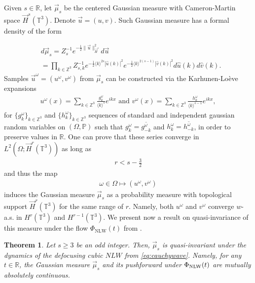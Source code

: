 \documentclass[a4paper, reqno, 11pt]{amsart}
\newtheorem{theorem}{Theorem}[section]
\theoremstyle{definition}
\begin{document}
Given $s \in \mathbb{R}$, let $\vec{\mu}_s$ be the centered Gaussian measure with Cameron-Martin space $\vec{H}^s(\mathbb{T}^3)$. Denote $\vec{u} = (u,v)$. Such Gaussian measure has a formal density of the form

\begin{align*}
&d \vec{\mu}_s = Z_s^{-1} e^{-\frac{1}{2} \| \vec{u} \|^2_{\vec{H}^s}} d\vec{u} \nonumber \\
&= \prod_{k \in \mathbb{Z}^3} Z_{s,k}^{-1} e^{-\frac{1}{2} \langle k \rangle^{2s} |\widehat{u}(k)|^2} e^{-\frac{1}{2} \langle k \rangle^{2(s-1)} |\widehat{v}(k)|^2} d \widehat{u}(k) d\widehat{v}(k).
\end{align*}
Samples $\vec{u}^{\omega} = (u^{\omega},v^{\omega})$ from $\vec{\mu}_s$ can be constructed via the Karhunen-Loève expansions
\begin{align}\label{eq:randomid}
u^{\omega}(x) = \sum_{k \in \mathbb{Z}^3} \frac{g_k^{\omega}}{\langle k \rangle^s} e^{ikx} \text{ and }  v^{\omega}(x) = \sum_{k \in \mathbb{Z}^3} \frac{h_k^{\omega}}{\langle k \rangle^{s-1}} e^{ikx},
\end{align}
for $\{g_k^{\omega}\}_{k \in \mathbb{Z}^3}$ and $\{h_k^{\omega}\}_{k \in \mathbb{Z}^3}$ sequences of standard and independent gaussian random variables on $(\Omega,\mathbb{P})$ such that $g_k^{\omega} = \overline{g_{-k}^{\omega}}$ and $h_k^{\omega} = \overline{h_{-k}^{\omega}}$, in order to preserve values in $\mathbb{R}$. One can prove that these series converge in $L^2(\Omega;\vec{H}^r(\mathbb{T}^3))$ as long as
\begin{align*}
r < s - \frac{3}{2}
\end{align*}
and thus the map
\begin{align*}
\omega \in \Omega \mapsto (u^{\omega},v^{\omega})
\end{align*}
induces the Gaussian measure $\vec{\mu}_s$ as a probability measure with topological support $\vec{H}^r(\mathbb{T}^3)$ for the same range of $r$. Namely, both $u^{\omega}$ and $v^{\omega}$ converge $w$-a.s. in $H^r(\mathbb{T}^3)$ and $H^{r-1}(\mathbb{T}^3)$. We present now a result on quasi-invariance of this measure under the flow $\Phi_{\text{NLW}}(t)$ from \cite{GOTW22}.

\begin{theorem}\label{thm-qinv}
Let $s \geq 3$ be an odd integer. Then, $\vec{\mu}_s$ is quasi-invariant under the dynamics of the defocusing cubic $NLW$ from \eqref{eq:cauchywave}. Namely, for any $t \in \mathbb{R}$, the Gaussian measure $\vec{\mu}_s$ and its pushforward under $\Phi_{\text{\text{NLW}}}(t)$ are mutually absolutely continuous.
\end{theorem}
\end{document}
